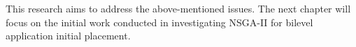 This research aims to address the above-mentioned issues. The next chapter will focus on the initial work conducted in investigating NSGA-II for bilevel application initial placement.

















